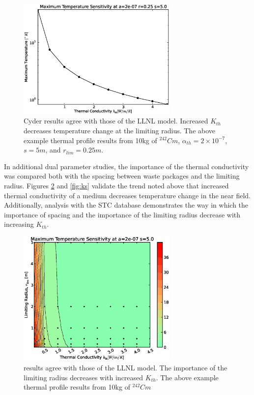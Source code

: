   \begin{figure}[htbp!]
    \begin{center}
      \includegraphics[width=0.7\textwidth]{./chapters/demonstration/conductivity/conductivity_cyder.eps}
    \end{center}
    \caption[$K_{th}$ Sensitivity in Cyder]
    {Cyder results agree with those of the LLNL model. Increased $K_{th}$ 
    decreases 
    temperature change at the limiting radius. The above example thermal 
    profile results from 10kg of $^{242}Cm$, $\alpha_{th}=2\times 10^{-7}$, 
    $s=5m$, 
    and $r_{lim}=0.25m$.}
    \label{fig:conductivity_cyder}
  \end{figure}


In additional dual parameter studies, the importance of the thermal conductivity 
was compared both with the spacing between waste packages and the limiting 
radius. Figures \ref{fig:kr} and \ref{fig:ks} validate the trend noted above 
that increased thermal conductivity of a medium decreases temperature change in 
the near field.  Additionally, analysis with the \Cyder STC database 
demonstrates the way in which the importance of spacing and the importance of 
the limiting radius decrease with increasing $K_{th}$.

\begin{figure}[htbp!]
\begin{center}
\includegraphics[width=0.7\textwidth]{./chapters/demonstration/conductivity/kr.eps}
\end{center}
\caption[$K_{th}$ vs. $r_{lim}$ Sensitivity in Cyder]{\Cyder results agree with 
those of the LLNL model. The importance of the limiting radius decreases with 
increased $K_{th}$. The above example thermal profile results from 10kg of 
$^{242}Cm$}
\label{fig:kr}
\end{figure}

